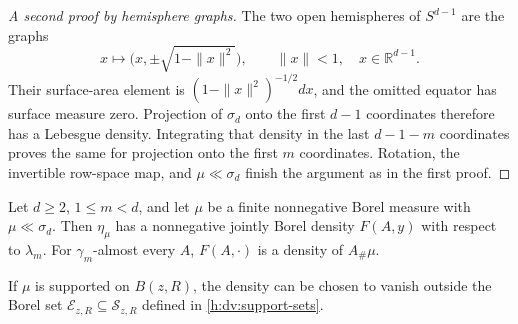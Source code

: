 \begin{proof}[A second proof by hemisphere graphs]
\label{h:dv:hemisphere-ac}
The two open hemispheres of \(S^{d-1}\) are the graphs
\[
 x\longmapsto\bigl(x,\pm\sqrt{1-\|x\|^2}\bigr),
 \qquad \|x\|<1,\quad x\in\mathbb R^{d-1}.
\]
Their surface-area element is
\((1-\|x\|^2)^{-1/2}dx\), and the omitted equator has surface measure
zero.  Projection of \(\sigma_d\) onto the first \(d-1\) coordinates
therefore has a Lebesgue density.  Integrating that density in the last
\(d-1-m\) coordinates proves the same for projection onto the first
\(m\) coordinates.  Rotation, the invertible row-space map, and
\(\mu\ll\sigma_d\) finish the argument as in the first proof.
\end{proof}

\begin{lemma}
\label{h:dv:joint-density}
Let \(d\ge2\), \(1\le m<d\), and let \(\mu\) be a finite nonnegative
Borel measure with \(\mu\ll\sigma_d\).  Then \(\eta_\mu\) has a
nonnegative jointly Borel density \(F(A,y)\) with respect to
\(\lambda_m\).  For \(\gamma_m\)-almost every \(A\),
\(F(A,\cdot)\) is a density of \(A_\#\mu\).

If \(\mu\) is supported on \(B(z,R)\), the density can be chosen to
vanish outside the Borel set \(\mathcal E_{z,R}\subseteq\mathcal S_{z,R}\)
defined in \eqref{h:dv:support-sets}.
\end{lemma}


